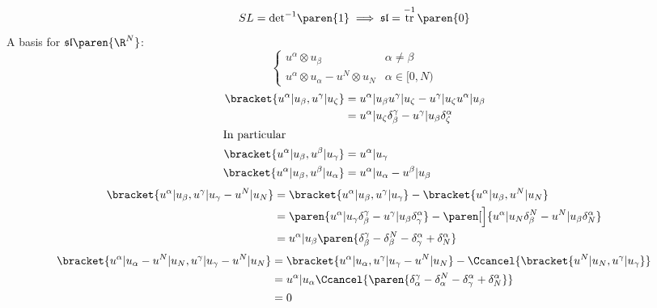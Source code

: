 \documentclass{scrartcl}
\DeclareMathOperator{\trace}{tr}
\newcommand{\SL}{SL}
\newcommand{\sl}{\mathfrak{sl}}
\begin{document}
\[
  \SL = {\det}^{-1}\paren{1} \implies
  \sl = \trace^{-1}\paren{0}
\]
A basis for \(\sl\paren{\R^N}\):
\[
  \begin{cases}
    u^\alpha\otimes u_\beta & \alpha\neq\beta \\
    u^\alpha\otimes u_\alpha-u^N\otimes u_N & \alpha \in [0,N)
  \end{cases}
\]
\renewcommand{\otimes}{\vert}
\begin{align*}
  \bracket{u^\alpha\otimes u_\beta, u^\gamma\otimes u_\zeta} &= u^\alpha\otimes u_\beta u^\gamma\otimes u_\zeta - u^\gamma\otimes u_\zeta u^\alpha\otimes u_\beta \\
  &= u^\alpha\otimes u_\zeta \delta^\gamma_\beta - u^\gamma\otimes u_\beta \delta^\alpha_\zeta\\
    \shortintertext{In particular}
\bracket{u^\alpha\otimes u_\beta, u^\beta\otimes u_\gamma} &= u^\alpha\otimes u_\gamma \\
\bracket{u^\alpha\otimes u_\beta, u^\beta\otimes u_\alpha} &= u^\alpha\otimes u_\alpha - u^\beta\otimes u_\beta
\end{align*}
\begin{align*}
  \bracket{u^\alpha\otimes u_\beta, u^\gamma\otimes u_\gamma - u^N\otimes u_N}
  &= \bracket{u^\alpha\otimes u_\beta, u^\gamma \otimes u_\gamma} -\bracket{u^\alpha\otimes u_\beta, u^N\otimes u_N} \\
  &= \paren{u^\alpha\otimes u_\gamma \delta^\gamma_\beta-u^\gamma\otimes u_\beta\delta^\alpha_\gamma} - \paren[\Big]{u^\alpha\otimes u_N \delta^N_\beta - u^N\otimes u_\beta \delta^\alpha_N} \\
  &= u^\alpha\otimes u_\beta \paren{\delta^\gamma_\beta - \delta^N_\beta - \delta^\alpha_\gamma + \delta^\alpha_N }
\end{align*}
\begin{align*}
  \bracket{u^\alpha \otimes u_\alpha - u^N\otimes u_N , u^\gamma \otimes u_\gamma - u^N \otimes u_N}
  &= \bracket{u^\alpha \otimes u_\alpha, u^\gamma\otimes u_\gamma - u^N\otimes u_N } - \Ccancel{\bracket{u^N\otimes u_N,u^\gamma \otimes u_\gamma}} \\
  &= u^\alpha\otimes u_\alpha \Ccancel{\paren{\delta^\gamma_\alpha - \delta^N_\alpha - \delta^\alpha_\gamma + \delta^\alpha_N}} \\
    &=0
\end{align*}
\end{document}
